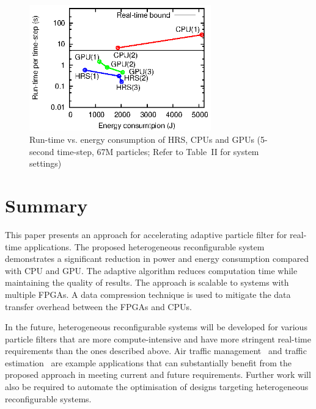 \begin{figure}[t!]
\centering
\includegraphics[width=0.7\textwidth]{runtime_reconfiguration/figures/fig_scale}
\caption{Run-time vs. energy consumption of HRS, CPUs and GPUs (5-second time-step, 67M particles; Refer to Table~II for system settings)}
\label{fig:scale}
\end{figure}


\section{Summary}

This paper presents an approach for accelerating adaptive particle filter for real-time applications.
The proposed heterogeneous reconfigurable system demonstrates a significant reduction in power and energy consumption compared with CPU and GPU.
The adaptive algorithm reduces computation time while maintaining the quality of results. 
The approach is scalable to systems with multiple FPGAs.
A data compression technique is used to mitigate the data transfer overhead between the FPGAs and CPUs.

In the future, heterogeneous reconfigurable systems will be developed for various particle filters that are more compute-intensive and have more stringent real-time requirements than the ones described above.
Air traffic management~\cite{chau13b} and traffic estimation~\cite{mihaylova07} are example applications that can substantially benefit from the proposed approach in meeting current and future requirements.
Further work will also be required to automate the optimisation of designs targeting heterogeneous reconfigurable systems.




